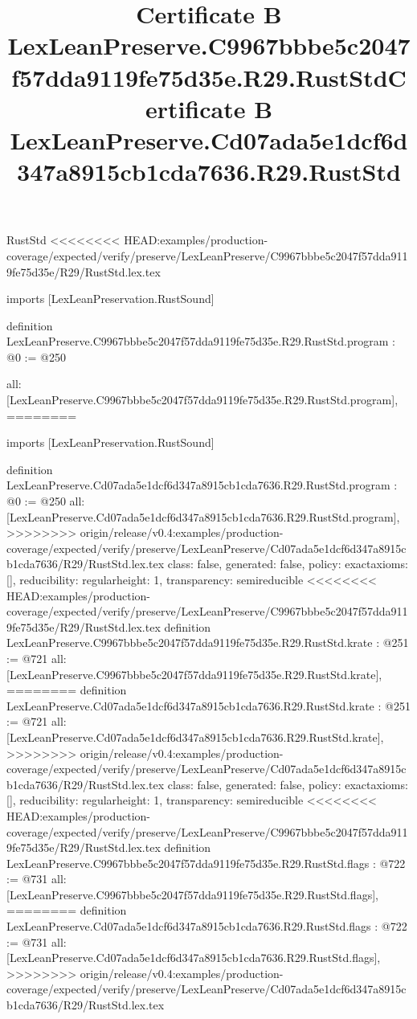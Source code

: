 \begin{lexlean}{RustStd}
<<<<<<<< HEAD:examples/production-coverage/expected/verify/preserve/LexLeanPreserve/C9967bbbe5c2047f57dda9119fe75d35e/R29/RustStd.lex.tex
\title{Certificate B LexLeanPreserve.C9967bbbe5c2047f57dda9119fe75d35e.R29.RustStd}
\begin{coremodule}
imports [LexLeanPreservation.RustSound]

definition LexLeanPreserve.C9967bbbe5c2047f57dda9119fe75d35e.R29.RustStd.program : @0 := @250 {
  all: [LexLeanPreserve.C9967bbbe5c2047f57dda9119fe75d35e.R29.RustStd.program],
========
\title{Certificate B LexLeanPreserve.Cd07ada5e1dcf6d347a8915cb1cda7636.R29.RustStd}
\begin{coremodule}
imports [LexLeanPreservation.RustSound]

definition LexLeanPreserve.Cd07ada5e1dcf6d347a8915cb1cda7636.R29.RustStd.program : @0 := @250 {
  all: [LexLeanPreserve.Cd07ada5e1dcf6d347a8915cb1cda7636.R29.RustStd.program],
>>>>>>>> origin/release/v0.4:examples/production-coverage/expected/verify/preserve/LexLeanPreserve/Cd07ada5e1dcf6d347a8915cb1cda7636/R29/RustStd.lex.tex
  class: false,
  generated: false,
  policy: exact{axioms: []},
  reducibility: regular{height: 1},
  transparency: semireducible
}
<<<<<<<< HEAD:examples/production-coverage/expected/verify/preserve/LexLeanPreserve/C9967bbbe5c2047f57dda9119fe75d35e/R29/RustStd.lex.tex
definition LexLeanPreserve.C9967bbbe5c2047f57dda9119fe75d35e.R29.RustStd.krate : @251 := @721 {
  all: [LexLeanPreserve.C9967bbbe5c2047f57dda9119fe75d35e.R29.RustStd.krate],
========
definition LexLeanPreserve.Cd07ada5e1dcf6d347a8915cb1cda7636.R29.RustStd.krate : @251 := @721 {
  all: [LexLeanPreserve.Cd07ada5e1dcf6d347a8915cb1cda7636.R29.RustStd.krate],
>>>>>>>> origin/release/v0.4:examples/production-coverage/expected/verify/preserve/LexLeanPreserve/Cd07ada5e1dcf6d347a8915cb1cda7636/R29/RustStd.lex.tex
  class: false,
  generated: false,
  policy: exact{axioms: []},
  reducibility: regular{height: 1},
  transparency: semireducible
}
<<<<<<<< HEAD:examples/production-coverage/expected/verify/preserve/LexLeanPreserve/C9967bbbe5c2047f57dda9119fe75d35e/R29/RustStd.lex.tex
definition LexLeanPreserve.C9967bbbe5c2047f57dda9119fe75d35e.R29.RustStd.flags : @722 := @731 {
  all: [LexLeanPreserve.C9967bbbe5c2047f57dda9119fe75d35e.R29.RustStd.flags],
========
definition LexLeanPreserve.Cd07ada5e1dcf6d347a8915cb1cda7636.R29.RustStd.flags : @722 := @731 {
  all: [LexLeanPreserve.Cd07ada5e1dcf6d347a8915cb1cda7636.R29.RustStd.flags],
>>>>>>>> origin/release/v0.4:examples/production-coverage/expected/verify/preserve/LexLeanPreserve/Cd07ada5e1dcf6d347a8915cb1cda7636/R29/RustStd.lex.tex
}}}
\end{coremodule}}
\end{coremodule}
\end{lexlean}
